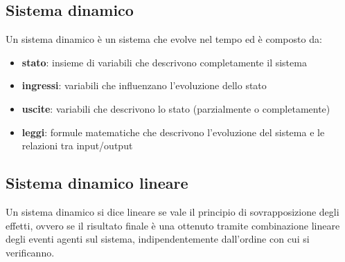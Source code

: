 \documentclass[a4paper]{article}
\begin{document}
\subsection{Sistema dinamico}
Un sistema dinamico è un sistema che evolve nel tempo ed è composto da:
\begin{itemize}
	\item \textbf{stato}: insieme di variabili che descrivono completamente il sistema
	\item \textbf{ingressi}: variabili che influenzano l'evoluzione dello stato
	\item \textbf{uscite}: variabili che descrivono lo stato (parzialmente o completamente)
	\item \textbf{leggi}: formule matematiche che descrivono l'evoluzione del sistema e le relazioni tra input/output
\end{itemize}

\subsection{Sistema dinamico lineare}
Un sistema dinamico si dice lineare se vale il principio di sovrapposizione degli effetti, ovvero se il risultato finale è una
ottenuto tramite combinazione lineare degli eventi agenti sul sistema, indipendentemente dall'ordine con cui si verificanno.
\end{document}
